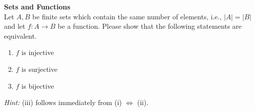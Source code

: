 \textbf{Sets and Functions}\\
Let $A, B$ be finite sets which contain the same number of elements, i.e., $|A| = |B|$ and let $f: A \rightarrow B$ be a function. Please show that
	the following statements are equivalent.
	\begin{enumerate}
		\item $f$ is injective
		\item $f$ is surjective
		\item $f$ is bijective
	\end{enumerate}
		\textit{Hint:} (iii) follows immediately from (i) $\Leftrightarrow$ (ii).